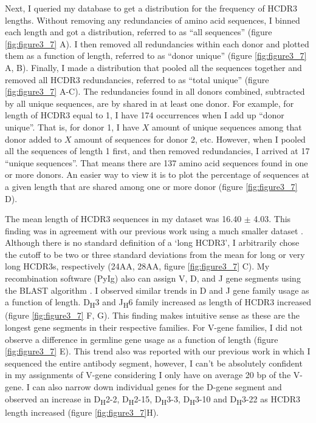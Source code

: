 Next, I queried my database to get a distribution for the frequency of HCDR3 lengths. Without removing any redundancies of amino acid sequences, I binned each length and got a distribution, referred to as ``all sequences'' (figure \ref{fig:figure3_7} A). I then removed all redundancies within each donor and plotted them as a function of length, referred to as ``donor unique'' (figure \ref{fig:figure3_7} A, B). Finally, I made a distribution that pooled all the sequences together and removed all HCDR3 redundancies, referred to as ``total unique'' (figure \ref{fig:figure3_7} A-C). The redundancies found in all donors combined, subtracted by all unique sequences, are by shared in at least one donor. For example, for length of HCDR3 equal to 1, I have 174 occurrences when I add up ``donor unique''. That is, for donor 1, I have $X$ amount of unique sequences among that donor added to $X$ amount of sequences for donor 2, etc. However, when I pooled all the sequences of length 1 first, and then removed redundancies, I arrived at 17 ``unique sequences''. That means there are 137 amino acid sequences found in one or more donors. An easier way to view it is to plot the percentage of sequences at a given length that are shared among one or more donor (figure \ref{fig:figure3_7} D).

The mean length of HCDR3 sequences in my dataset was 16.40 $\pm$ 4.03. This finding was in agreement with our previous work using a much smaller dataset \citep{Briney:2012ib}. Although there is no standard definition of a `long HCDR3', I arbitrarily chose the cutoff to be two or three standard deviations from the mean for long or very long HCDR3s, respectively (24AA, 28AA, figure \ref{fig:figure3_7} C). My recombination software (PyIg) also can assign V, D, and J gene segments using the BLAST algorithm \citep{Ye:2013bb}. I observed similar trends in D and J gene family usage as a function of length. D\textsubscript{H}3 and J\textsubscript{H}6 family increased as length of HCDR3 increased (figure \ref{fig:figure3_7} F, G). This finding makes intuitive sense as these are the longest gene segments in their respective families. For V-gene families, I did not observe a difference in germline gene usage as a function of length (figure \ref{fig:figure3_7} E). This trend also was reported with our previous work in which I sequenced the entire antibody segment, however, I can't be absolutely confident in my assignments of V-gene considering I only have on average 20 bp of the V-gene. I can also narrow down individual genes for the D-gene segment and observed an increase in D\textsubscript{H}2-2, D\textsubscript{H}2-15, D\textsubscript{H}3-3, D\textsubscript{H}3-10 and D\textsubscript{H}3-22 as HCDR3 length increased (figure \ref{fig:figure3_7}H).

